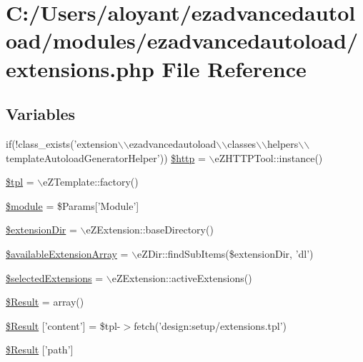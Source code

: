 \hypertarget{extensions_8php}{\section{C\-:/\-Users/aloyant/ezadvancedautoload/modules/ezadvancedautoload/extensions.php File Reference}
\label{extensions_8php}
}
\subsection*{Variables}
\begin{DoxyCompactItemize}
\item 
if(!class\-\_\-exists('extension$\backslash$$\backslash$ezadvancedautoload$\backslash$$\backslash$classes$\backslash$$\backslash$helpers$\backslash$$\backslash$template\-Autoload\-Generator\-Helper')) \hyperlink{extensions_8php_ae2175412b6e13dcffd550559db6a2e65}{\$http} = $\backslash$e\-Z\-H\-T\-T\-P\-Tool\-::instance()
\item 
\hyperlink{extensions_8php_a04b1944cdb09f9a4e290cde7a12499e6}{\$tpl} = $\backslash$e\-Z\-Template\-::factory()
\item 
\hyperlink{extensions_8php_ac531301c55a8d8b6c7613597218ff482}{\$module} = \$Params\mbox{[}'Module'\mbox{]}
\item 
\hyperlink{extensions_8php_a511fe73f345235dca8dfab597f398521}{\$extension\-Dir} = $\backslash$e\-Z\-Extension\-::base\-Directory()
\item 
\hyperlink{extensions_8php_a6fef3e6ef57dbe6a39892b6de0cc7f5f}{\$available\-Extension\-Array} = $\backslash$e\-Z\-Dir\-::find\-Sub\-Items(\$extension\-Dir, 'dl')
\item 
\hyperlink{extensions_8php_adb784a735925c0ca3b600a1e0b1df50e}{\$selected\-Extensions} = $\backslash$e\-Z\-Extension\-::active\-Extensions()
\item 
\hyperlink{extensions_8php_a390d5702f3c15330fd764dbf08d5b2db}{\$\-Result} = array()
\item 
\hyperlink{extensions_8php_a0d32c70e3cf8c7b3fe5e4a499e9cd58f}{\$\-Result} \mbox{[}'content'\mbox{]} = \$tpl-\/$>$fetch('design\-:setup/extensions.\-tpl')
\item 
\hyperlink{extensions_8php_a94a2cc5784adee982dec0235638f6251}{\$\-Result} \mbox{[}'path'\mbox{]}
\end{DoxyCompactItemize}


